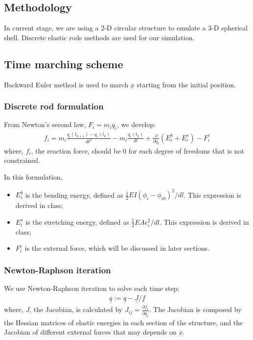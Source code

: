 \documentclass[letterpaper,9pt]{article}
\begin{document}
\begin{multicols}{2}
	\section{Methodology}
		In current stage, we are using a 2-D circular structure to emulate a 3-D spherical shell. Discrete elastic rods \cite{Bergou08} methods are used for our simulation.	

		\subsection{Time marching scheme}
			Backward Euler method is used to march $\underline x$ starting from the initial position.
			\subsubsection{Discrete rod formulation}
				From Newton's second law, $ F_i = m_i\ddot q_i$, we develop:
				\begin{align}
					f_i = m_i\frac{q_i(t_{k+1}) - q_i(t_k)}{dt^2} - m_i\frac{\dot q_i(t_k)}{dt} + \frac{\partial}{\partial q_i}(E_i^b + E_i^s) - F_i^e
				\end{align}
				where, $f_i$, the reaction force, should be $0$ for each degree of freedoms that is not constrained.
				
				In this formulation,
				\begin{itemize}
					\item $E_i^b$ is the bending energy, defined as $\frac12 EI(\phi_i - \phi_{i0})^2 / dl$. This expression is derived in class;
					\item $E_i^s$ is the stretching energy, defined as $\frac12 EA \epsilon_i^2 / dl$. This expression is derived in class;
					\item $F_i^e$ is the external force, which will be discussed in later sections.
				\end{itemize}
			\subsubsection{Newton-Raphson iteration}
				We use Newton-Raphson iteration to solve each time step:
				\begin{align}
					\underline q := \underline q - \underline{\underline J} / \underline{f}
				\end{align}
				where, $J$, the Jacobian, is calculated by $J_{ij} = \frac{\partial f_i}{\partial q_j}$. The Jacobian is composed by the Hessian matrices of elastic energies in each section of the structure, and the Jacobian of different external forces that may depends on $\underline x$.
				

\end{multicols}
\end{document}
